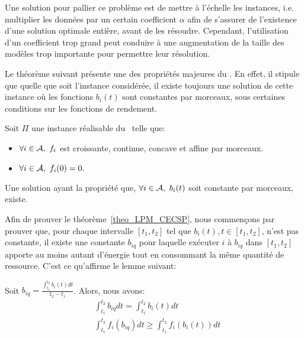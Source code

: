 Une solution pour pallier ce problème est de mettre à l'échelle les
instances, i.e. multiplier les données par un certain coefficient $\alpha$
afin de s'assurer de l'existence d'une solution optimale entière,
avant de les résoudre. Cependant, l'utilisation d'un coefficient trop
grand peut conduire à une augmentation de la taille des modèles trop
importante pour permettre leur résolution. 


Le théorème suivant présente une des propriétés majeures du \CECSP. En
effet, il stipule que quelle que soit l'instance considérée, il existe
toujours une solution de cette instance où les fonctions $b_i(t)$ sont
constantes par morceaux, sous certaines conditions sur les fonctions de
rendement.  

\begin{theo}
\label{theo_LPM_CECSP}
Soit $\Pi$ une instance réalisable du \CECSP~telle que:
\begin{itemize}
\item $\forall i \in {\cal A},\ f_i$ est croissante, continue, concave et
  affine par morceaux. 
\item $\forall i \in \A,\ f_i(0)=0.$
\end{itemize}
Une solution ayant la propriété que, $\forall i \in {\cal A},\ b_i(t)$ soit
constante par morceaux, existe.
\end{theo}

Afin de prouver le théorème~\ref{theo_LPM_CECSP}, nous commençons par
prouver que, pour chaque intervalle $[t_1,t_2]$ tel que $b_i(t), t \in
[t_1,t_2]$, n'est pas constante, il existe une constante $b_{iq}$ pour
laquelle exécuter $i$ à $b_{iq}$ dans $[t_1,t_2]$ apporte au moins
autant d'énergie tout en consommant la même quantité de
ressource. C'est ce qu'affirme le lemme suivant:

\begin{lemma}
\label{lemmaEn}
Soit $b_{iq}= \frac{\int_{t_1}^{t_2}b_i(t)dt}{t_2-t_1}$. Alors, nous
avons:
\begin{align}
  &\int_{t_1}^{t_2}b_{iq}dt = \int_{t_1}^{t_2} b_i(t) dt \label{eq_LPM_res} \\
  & \int_{t_1}^{t_2}f_i(b_{iq})dt \ge \int_{t_1}^{t_2} f_i(b_i(t)) dt 
    \label{eq_LPM_nrj}
\end{align}
\end{lemma}

